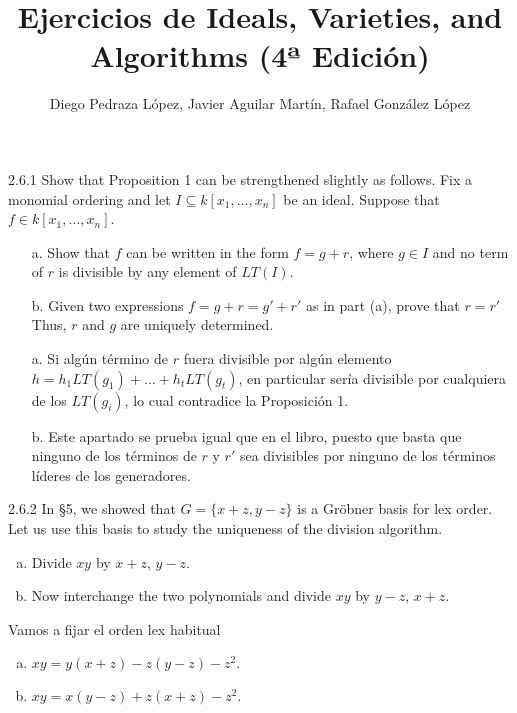 \documentclass[twoside]{article}
\begin{document}
\title{Ejercicios de Ideals, Varieties, and Algorithms (4ª Edición)}
\author{Diego Pedraza López, Javier Aguilar Martín, Rafael González López}
\maketitle

\begin{ejercicio}{2.6.1}
Show that Proposition 1 can be strengthened slightly as follows. Fix a monomial ordering
and let $I ⊆ k[x_1,\dots , x_n]$ be an ideal. Suppose that $f ∈ k[x_1,\dots , x_n]$.
\begin{enumerate}
\item[a.] Show that $f$ can be written in the form $f = g + r$, where $g ∈ I$ and no term of $r$ is
divisible by any element of $LT(I)$.
\item[b.] Given two expressions $f = g + r = g'
+ r'$ as in part (a), prove that $r = r'$ Thus, $r$
and $g$ are uniquely determined.
\end{enumerate}
\end{ejercicio}

\begin{solucion}
\begin{enumerate}
\item[a.] Si algún término de $r$ fuera divisible por algún elemento $h=h_1LT(g_1)+\dots+h_tLT(g_t)$, en particular sería divisible por cualquiera de los $LT(g_i)$, lo cual contradice la Proposición 1.

\item[b.] Este apartado se prueba igual que en el libro, puesto que basta que ninguno de los términos de $r$ y $r'$ sea divisibles por ninguno de los términos líderes de los generadores.
\end{enumerate}
\end{solucion}

\newpage

\begin{ejercicio}{2.6.2}
In §5, we showed that $G = \{x + z, y − z\}$ is a Gröbner basis for lex order. Let us use
this basis to study the uniqueness of the division algorithm.
\begin{enumerate}[a.]
\item Divide $xy$ by $x + z$, $y − z$.
\item Now interchange the two polynomials and divide $xy$ by $y − z$, $x + z$.
\end{enumerate}
\end{ejercicio}
\begin{solucion}
Vamos a fijar el orden lex habitual
\begin{enumerate}[a.]
\item $xy=y(x+z)-z(y-z)-z^2.$
\item $xy=x(y-z)+z(x+z)-z^2.$
\end{enumerate}
\end{solucion}
\newpage
\end{document}
